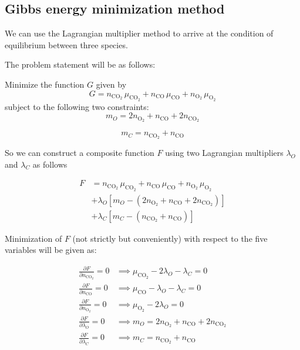\subsection{Gibbs energy minimization method}

We can use the Lagrangian multiplier method to arrive at the condition of equilibrium between three species.

The problem statement will be as follows:

Minimize the function $G$ given by
\begin{equation}
 G = n_{\text{CO}_2} \, \mu_{\text{CO}_2} + n_\text{CO} \, \mu_\text{CO} + n_{\text{O}_2} \, \mu_{\text{O}_2} \end{equation}
subject to the following two constraints:
\begin{equation}
 m_O = 2 n_{\text{O}_2} + n_\text{CO} + 2 n_{\text{CO}_2} \end{equation}

\begin{equation}
 m_C = n_{\text{CO}_2} + n_\text{CO} \end{equation}

So we can construct a composite function $F$ using two Lagrangian multipliers $\lambda_O$ and $\lambda_C$ as follows

\begin{eqnarray}
 F & = n_{\text{CO}_2} \, \mu_{\text{CO}_2} + n_\text{CO} \, \mu_\text{CO} + n_{\text{O}_2} \, \mu_{\text{O}_2} \nonumber \\
 & + \lambda_O \left[ m_O - \left( 2 n_{\text{O}_2} + n_\text{CO} + 2 n_{\text{CO}_2} \right) \right] \nonumber \\
 & + \lambda_C \left[ m_C - \left( n_{\text{CO}_2} + n_\text{CO} \right) \right]\end{eqnarray}

Minimization of $F$ (not strictly but conveniently) with respect to the five variables will be given as:

\begin{eqnarray}
 \frac{\partial F}{\partial n_{\text{CO}_2}} = 0 & \implies \mu_{\text{CO}_2} - 2 \lambda_O - \lambda_C = 0 \nonumber \\
 \frac{\partial F}{\partial n_\text{CO}} = 0 & \implies \mu_\text{CO} - \lambda_O - \lambda_C = 0  \nonumber \\
 \frac{\partial F}{\partial n_{\text{O}_2}} = 0 & \implies \mu_{\text{O}_2} - 2 \lambda_O = 0 \nonumber \\
 \frac{\partial F}{\partial \lambda_O} = 0 & \implies m_O = 2 n_{\text{O}_2} + n_\text{CO} + 2 n_{\text{CO}_2} \nonumber \\
 \frac{\partial F}{\partial \lambda_C} = 0 & \implies m_C = n_{\text{CO}_2} + n_\text{CO} 
\end{eqnarray}

